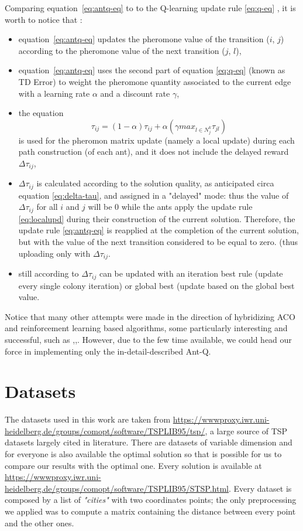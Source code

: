Comparing equation~\ref{eq:antq-eq} to to the Q-learning update rule \ref{eq:q-eq} , it is worth to notice that :
\begin{itemize}
\item  equation~\ref{eq:antq-eq}  updates the pheromone  value  of  the  transition  ($i$, $j$)  according to the  pheromone  value  of  the  next transition  ($j$, $ l$),
\item equation~\ref{eq:antq-eq} uses  the second part of equation \ref{eq:q-eq} (known as TD Error) to  weight the  pheromone  quantity associated  to  the current  edge  with  a learning  rate $\alpha$  and  a discount  rate $\gamma$, 
\item the equation 
\begin{equation}
\tau_{ij}= (1-\alpha) \tau_{ij} + \alpha(\gamma max_{l\in N^k_j}\tau_{jl}) 
\label{eq:localupd}
\end{equation}
is used for the pheromon matrix update (namely a local update) during each path construction (of each ant), and it does not include the delayed reward $\Delta \tau_{ij}$,
\item $\Delta \tau_{ij}$ is calculated according to the solution quality, as anticipated circa equation \ref{eq:delta-tau}, and assigned in a "delayed" mode: thus the value of $\Delta \tau_{ij}$  for all $i$ and $j$ will be $0$ while the ants  apply  the  update  rule \ref{eq:localupd}  during  their  construction  of the  current solution. 
Therefore, the update rule \ref{eq:antq-eq}	 is reapplied at the completion of the current solution, but with the value of the next transition considered to be equal to zero. (thus uploading only with $\Delta \tau_{ij}$.

\item still according to \cite{undici} \cite{diciotto} $\Delta \tau_{ij}$ can be updated with an iteration  best  rule (update every single colony iteration) or  global  best (update based on the global best value.
\end{itemize}

Notice that many other attempts were made in the direction of hybridizing ACO and reinforcement learning based algorithms, some particularly interesting and successful, such as \cite{quattordici},\cite{quindici},\cite{sedici}. However, due to the few time available, we could head our force in implementing only the in-detail-described Ant-Q.

\section{Datasets}
The datasets used in this work are taken from  \url{https://wwwproxy.iwr.uni-heidelberg.de/groups/comopt/software/TSPLIB95/tsp/}, a large source of TSP datasets largely cited in literature. 
There are datasets of variable dimension and for everyone is also available the optimal solution so that is possible for us to compare our results with the optimal one. 
Every solution is available at \url{https://wwwproxy.iwr.uni-heidelberg.de/groups/comopt/software/TSPLIB95/STSP.html}. Every dataset is composed by a list of \textit{"cities"} with two coordinates points; the only preprocessing we applied was to compute a matrix containing the distance between every point and the other ones.
